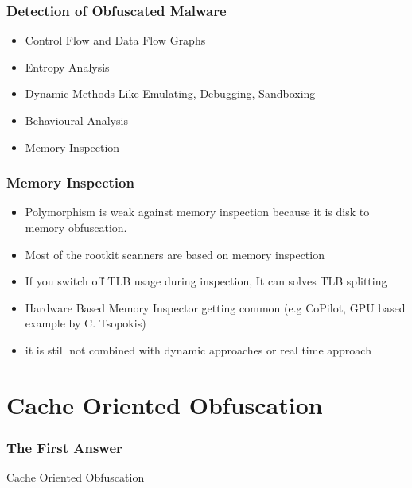 \documentclass{beamer}
\begin{document}
\begin{frame}
	\frametitle{Detection of Obfuscated Malware}
	\begin{itemize}
		\item Control Flow and Data Flow Graphs
		\item Entropy Analysis
		\item Dynamic Methods Like Emulating, Debugging, Sandboxing
		\item Behavioural Analysis
		\item Memory Inspection
	\end{itemize}
\end{frame}

\begin{frame}
	\frametitle{Memory Inspection}
	\begin{itemize}
		\item Polymorphism is weak against memory inspection because it is disk to memory obfuscation.
		\item Most of the rootkit scanners are based on memory inspection
		\item If you switch off TLB usage during inspection, It can solves TLB splitting
		\item Hardware Based Memory Inspector getting common (e.g CoPilot, GPU based example by C. Tsopokis)
		\item it is still not combined with dynamic approaches or real time approach
	\end{itemize}
\end{frame}

















\section{Cache Oriented Obfuscation}
\begin{frame}
	\frametitle{The First Answer}
	\huge{\centerline{Cache Oriented Obfuscation}}
\end{frame}
\end{document}
